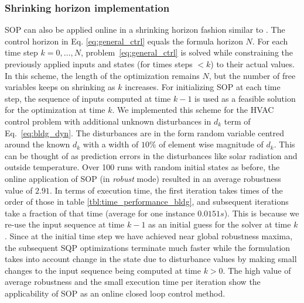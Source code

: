 \subsubsection{Shrinking horizon implementation} 
\label{sec:online}
SOP can also be applied online in a shrinking horizon fashion similar to \cite{Raman14_MPCSTL}. 
The control horizon in Eq. \eqref{eq:general_ctrl} equals the formula horizon $N$. %
For each time step $k=0,\dotsc,N$, problem~\eqref{eq:general_ctrl} is solved while constraining the previously applied inputs and states (for times steps $<k$) to their actual values. 
In this scheme, the length of the optimization remains $N$, but the number of free variables keeps on shrinking as $k$ increases. 
For initializing SOP at each time step, the sequence of inputs computed at time $k-1$ is used as a feasible solution for the optimization at time $k$. 
We implemented this scheme for the HVAC control problem with additional unknown disturbances in $d_k$ term of Eq.~\eqref{eq:bldg_dyn}.
The disturbances are in the form random variable centred around the known $d_k$ with a width of $10\%$ of element wise magnitude of $d_k$. This can be thought of as prediction errors in the disturbances like solar radiation and outside temperature. Over 100 runs with random initial states as before, the online application of SOP (in \textit{robust} mode) resulted in an average robustness value of $2.91$. In terms of execution time, the first iteration takes times of the order of those in table \ref{tbl:time_performance_bldg}, and subsequent iterations take a fraction of that time (average for one instance $0.0151s$). This is because we re-use the input sequence at time $k-1$ as an initial guess for the solver at time $k$. Since at the initial time step we have achieved near global robustness maxima, the subsequent SQP optimizations terminate much faster while the formulation takes into account change in the state due to disturbance values by making small changes to the input sequence being computed at time $k>0$. The high value of average robustness and the small execution time per iteration show the applicability of SOP as an online closed loop control method. 

